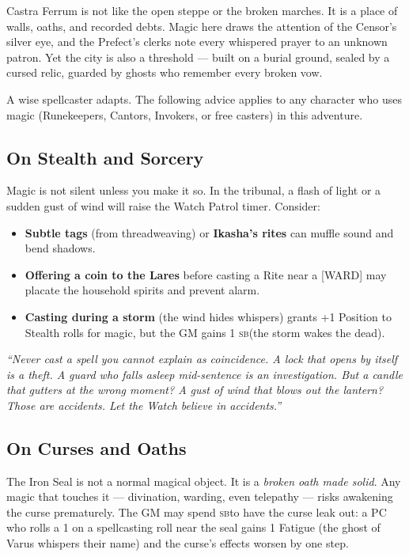 \documentclass[10pt,twoside]{book}
\newcommand{\tag}[1]{\textsc{[#1]}}
\newcommand{\sb}{\textsc{sb}}
\begin{document}
Castra Ferrum is not like the open steppe or the broken marches. It is a place of walls, oaths, and recorded debts. Magic here draws the attention of the Censor's silver eye, and the Prefect's clerks note every whispered prayer to an unknown patron. Yet the city is also a threshold --- built on a burial ground, sealed by a cursed relic, guarded by ghosts who remember every broken vow.

A wise spellcaster adapts. The following advice applies to any character who uses magic (Runekeepers, Cantors, Invokers, or free casters) in this adventure.

\subsection{On Stealth and Sorcery}

Magic is not silent unless you make it so. In the tribunal, a flash of light or a sudden gust of wind will raise the Watch Patrol timer. Consider:

\begin{itemize}
\item \textbf{Subtle tags} (from threadweaving) or \textbf{Ikasha's rites} can muffle sound and bend shadows.
\item \textbf{Offering a coin to the Lares} before casting a Rite near a \tag{WARD} may placate the household spirits and prevent alarm.
\item \textbf{Casting during a storm} (the wind hides whispers) grants +1 Position to Stealth rolls for magic, but the GM gains 1 \sb (the storm wakes the dead).
\end{itemize}

\begin{sidebar}
\textit{``Never cast a spell you cannot explain as coincidence. A lock that opens by itself is a theft. A guard who falls asleep mid-sentence is an investigation. But a candle that gutters at the wrong moment? A gust of wind that blows out the lantern? Those are accidents. Let the Watch believe in accidents.''}
\end{sidebar}

\subsection{On Curses and Oaths}

The Iron Seal is not a normal magical object. It is a \textit{broken oath made solid}. Any magic that touches it --- divination, warding, even telepathy --- risks awakening the curse prematurely. The GM may spend \sb to have the curse leak out: a PC who rolls a 1 on a spellcasting roll near the seal gains 1 Fatigue (the ghost of Varus whispers their name) and the curse's effects worsen by one step.
\end{document}
